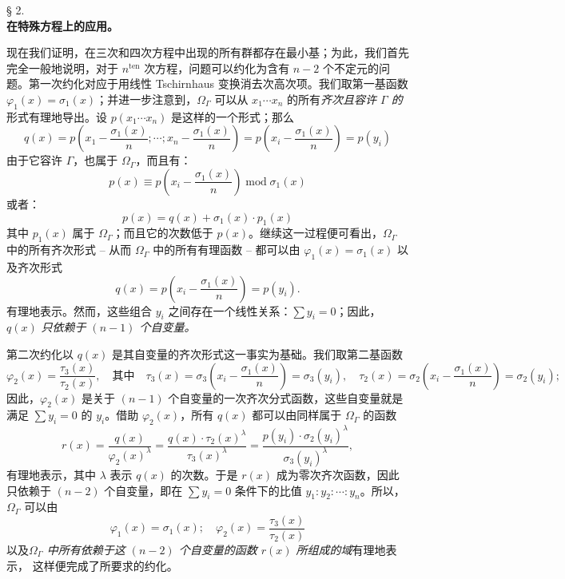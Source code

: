 \begin{center}
§ 2.\\[0.75em]
\textbf{在特殊方程上的应用。}
\end{center}

现在我们证明，在三次和四次方程中出现的所有群都存在最小基；为此，我们首先完全一般地说明，对于 $n^{\text{ten}}$ 次方程，问题可以约化为含有 $n-2$ 个不定元的问题。第一次约化对应于用线性 Tschirnhaus 变换消去次高次项。我们取第一基函数 $\varphi_1(x)=\sigma_1(x)$；并进一步注意到，$\Omega_\Gamma$ 可以从 $x_1\cdots x_n$ 的所有\emph{齐次且容许 $\Gamma$ 的}形式有理地导出。设 $p(x_1\cdots x_n)$ 是这样的一个形式；那么
\[
q(x)=p\left(x_1-\frac{\sigma_1(x)}{n};\cdots;x_n-\frac{\sigma_1(x)}{n}\right)=p\left(x_i-\frac{\sigma_1(x)}{n}\right)=p(y_i)
\]
由于它容许 $\Gamma$，也属于 $\Omega_\Gamma$，而且有：
\[
p(x)\equiv p\left(x_i-\frac{\sigma_1(x)}{n}\right)\operatorname{mod}\sigma_1(x)
\]
或者：
\[
p(x)=q(x)+\sigma_1(x)\cdot p_1(x)
\]
其中 $p_1(x)$ 属于 $\Omega_\Gamma$；而且它的次数低于 $p(x)$。继续这一过程便可看出，$\Omega_\Gamma$ 中的所有齐次形式 -- 从而 $\Omega_\Gamma$ 中的所有有理函数 -- 都可以由 $\varphi_1(x)=\sigma_1(x)$ 以及齐次形式
\[
q(x)=p\left(x_i-\frac{\sigma_1(x)}{n}\right)=p(y_i).
\]
有理地表示。然而，这些组合 $y_i$ 之间存在一个线性关系：$\sum y_i=0$；因此，$q(x)$ \emph{只依赖于 $(n-1)$ 个自变量。}

第二次约化以 $q(x)$ 是其自变量的齐次形式这一事实为基础。我们取第二基函数
\[
\varphi_2(x)=\frac{\tau_3(x)}{\tau_2(x)},\quad \text{其中}\quad
\tau_3(x)=\sigma_3\left(x_i-\frac{\sigma_1(x)}{n}\right)=\sigma_3(y_i),\quad
\tau_2(x)=\sigma_2\left(x_i-\frac{\sigma_1(x)}{n}\right)=\sigma_2(y_i);
\]
因此，$\varphi_2(x)$ 是关于 $(n-1)$ 个自变量的一次齐次分式函数，这些自变量就是满足 $\sum y_i=0$ 的 $y_i$。借助 $\varphi_2(x)$，所有 $q(x)$ 都可以由同样属于 $\Omega_\Gamma$ 的函数
\[
r(x)=\frac{q(x)}{\varphi_2(x)^\lambda}=\frac{q(x)\cdot\tau_2(x)^\lambda}{\tau_3(x)^\lambda}=\frac{p(y_i)\cdot\sigma_2(y_i)^\lambda}{\sigma_3(y_i)^\lambda},
\]
有理地表示，其中 $\lambda$ 表示 $q(x)$ 的次数。于是 $r(x)$ 成为零次齐次函数，因此只依赖于 $(n-2)$ 个自变量，即在 $\sum y_i=0$ 条件下的比值 $y_1:y_2:\cdots:y_n$。所以，$\Omega_\Gamma$ 可以由
\[
\varphi_1(x)=\sigma_1(x);\quad \varphi_2(x)=\frac{\tau_3(x)}{\tau_2(x)}
\]
以及\emph{$\Omega_\Gamma$ 中所有依赖于这 $(n-2)$ 个自变量的函数 $r(x)$ 所组成的域}有理地表示， 这样便完成了所要求的约化。

